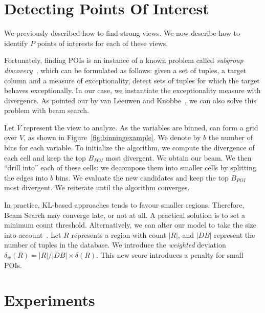 \section{Detecting Points Of Interest}
\label{sec:detec}

We previously described how to find strong views. We now
describe how to identify $P$ points of interests for each of these views. 

Fortunately, finding POIs is an instance of a known problem called
\emph{subgroup discovery}~\cite{klosgen1996explora, wrobel1997algorithm}, which
can be formulated as follows: given a set of tuples, a target column and a
measure of exceptionality, detect sets of tuples for which the target behaves
exceptionally. In our case, we instantiate the exceptionality measure
with divergence. As pointed our by van Leeuwen and Knobbe~\cite{van2011non}, we
can also solve this problem with beam search.

Let $V$ represent the view to analyze. As the variables are binned, can form a
grid over $V$, as shown in Figure~\ref{fig:binningexample}. We denote by $b$ the number of
bins for each variable. To initialize the algorithm, we compute the divergence of
each cell and keep the top $B_{POI}$ most divergent. We obtain our beam. We then
``drill into'' each of these cells: we decompose them into smaller cells by
splitting the edges into $b$ bins. We evaluate the new candidates and keep
the top $B_{POI}$ most divergent. We reiterate until the algorithm converges.

In practice, KL-based approaches tends to favour smaller regions. Therefore,
Beam Search may converge late, or not at all. A practical solution is to set a
minimum count threshold. Alternatively, we can alter our model to take the size
into account~\cite{van2011non}. Let $R$ represents a region with count $|R|$,
and $|DB|$ represent the number of tuples in the database. We introduce the
\emph{weighted} deviation $\delta_w(R) = |R|/|DB| \times \delta(R)$. This new
score introduces a penalty for small POIs.







\section{Experiments}
\label{sec:experiments}

